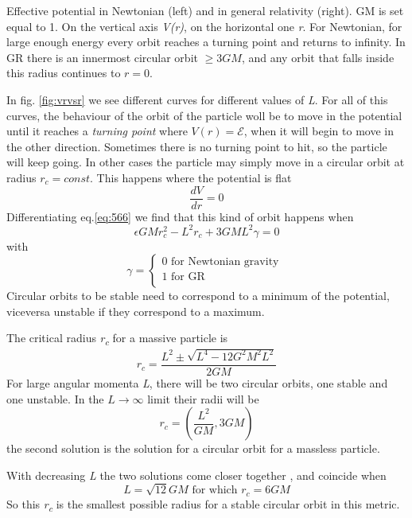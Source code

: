 Effective potential in Newtonian (left) and in general relativity (right). GM is set equal to 1. On the vertical axis \emph{V(r)}, on the horizontal one \emph{r}. For Newtonian, for large enough energy every orbit reaches a turning point and returns to infinity. In GR there is an innermost circular orbit $\geq 3GM$, and any orbit that falls inside this radius continues to $r=0$.\par
 
In fig. \ref{fig:vrvsr} we see different curves for different values of \emph{L}. For all of this curves, the behaviour of the orbit of the particle woll be to move in the  potential until it reaches a \emph{turning point} where $V\left( r \right) = \mathcal{E}$, when it will begin to move in the other direction. Sometimes there is no turning point to hit, so the particle will keep going. In other cases the particle may simply  move in a circular orbit at radius $r_{c} = const$. This happens where the potential is flat
\[
\frac{d V}{d r} = 0
\]
Differentiating eq.\ref{eq:566} we find that this kind of orbit happens when
\[
\epsilon GM r_{c}^{2}- L^{2}r_{c} + 3GML^{2}\gamma  = 0
\]
with 
\[
\gamma = \begin{cases}
0 \text{ for Newtonian gravity } \\
1 \text{ for GR } \\
\end{cases}
\]
Circular orbits to be stable need to correspond to a minimum of the potential, viceversa unstable if they correspond to a maximum.\par
The critical radius \emph{r\textsubscript{c}} for a massive particle is
\begin{equation}
	r_{c} = \frac{L^{2} \pm \sqrt{ L^{4} - 12G^{2} M^{2}L^{2}}}{2GM}
\end{equation}
For large angular momenta \emph{L}, there will be two circular orbits, one stable and one unstable. In the $L \to  \infty$ limit their radii will be
\begin{equation}
r_{c} = \left( \frac{L^{2}}{GM}, 3GM \right)
\end{equation}
the second solution is the solution for a circular orbit for a massless particle.\par
With decreasing \emph{ L} the two solutions come closer together , and coincide when 
\[
	L = \sqrt{12}GM \text{ for which } r_{c} = 6GM
\]
So this \emph{r\textsubscript{c}} is the smallest possible radius for a stable circular orbit in this metric.

